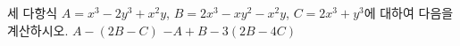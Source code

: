 세 다항식 $A=x^3-2y^3+x^2y$, $B=2x^3-xy^2-x^2y$, $C=2x^3+y^3$에 대하여 다음을 계산하시오.
 $A-(2B-C)$
 $-A+B-3(2B-4C)$

